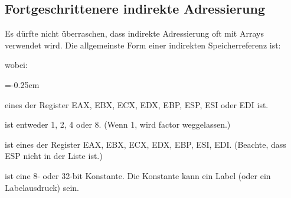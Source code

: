 \subsection{Fortgeschrittenere indirekte Adressierung
                 }

Es d\"{u}rfte nicht \"{u}berraschen, dass indirekte Adressierung oft mit
Arrays verwendet wird. Die allgemeinste Form einer indirekten
Speicherreferenz ist:
\begin{center}
{}
\end{center}
wobei:
\begin{description}
\parskip=-0.25em %

\item[base reg]
eines der Register EAX, EBX, ECX, EDX, EBP, ESP, ESI oder EDI ist.

\item[factor]
ist entweder 1, 2, 4 oder 8. (Wenn 1, wird {\code factor}
weggelassen.)

\item[index reg]
ist eines der Register  EAX, EBX, ECX, EDX, EBP, ESI, EDI. (Beachte,
dass ESP nicht in der Liste ist.)

\item[constant]
ist eine 8- oder 32-bit Konstante. Die Konstante kann ein Label
(oder ein Labelausdruck) sein.
\end{description}

